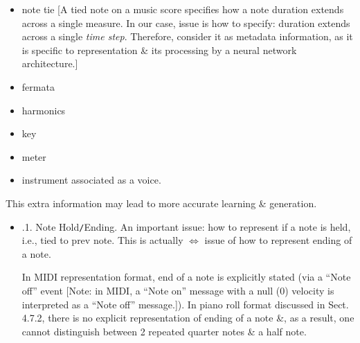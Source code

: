 \documentclass{article}
\begin{document}
\begin{itemize}
\begin{itemize}
\begin{itemize}
			\item note tie [A tied note on a music score specifies how a note duration extends across a single measure. In our case, issue is how to specify: duration extends across a single {\it time step}. Therefore, consider it as metadata information, as it is specific to representation \& its processing by a neural network architecture.]
			\item fermata
			\item harmonics
			\item key
			\item meter
			\item instrument associated as a voice.
		\end{itemize}
		This extra information may lead to more accurate learning \& generation.
		\begin{itemize}
			\item {.1. Note Hold{\tt/}Ending.} An important issue: how to represent if a note is held, i.e., tied to prev note. This is actually $\Leftrightarrow$ issue of how to represent ending of a note.
			
			In MIDI representation format, end of a note is explicitly stated (via a ``Note off'' event [Note: in MIDI, a ``Note on'' message with a null (0) velocity is interpreted as a ``Note off'' message.]). In piano roll format discussed in Sect. 4.7.2, there is no explicit representation of ending of a note \&, as a result, one cannot distinguish between 2 repeated quarter notes \& a half note.
			

\end{itemize}
\end{itemize}
\end{itemize}
\end{document}

